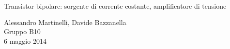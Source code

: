 \begin{center}

     	{\huge Transistor bipolare: sorgente di corrente costante, amplificatore di tensione}

	\vspace{0.3cm}

      	{\large Alessandro Martinelli, Davide Bazzanella} \\
     	\vspace{0.2cm}
		{\huge Gruppo B10} \\
	
	\vspace{0.1cm}
      	{6 maggio 2014}

\end{center}
